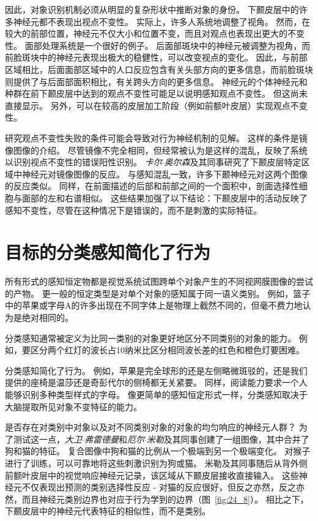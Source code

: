 因此，对象识别机制必须从明显的复杂形状中推断对象的身份。
下颞皮层中的许多神经元都不表现出视点不变性。
实际上，许多人系统地调整了视角。
然而，在较大的前部位置，神经元不仅大小和位置不变，而且对观点也表现出更大的不变性。
面部处理系统是一个很好的例子。
后面部斑块中的神经元被调整为视角，而前脸斑块中的神经元表现出极大的稳健性，可以改变视点的变化。
因此，与前部区域相比，后面面部区域中的人口反应包含有关头部方向的更多信息，而前脸斑块则提供了与后面部面积相比，有关跨头方向的更多信息。
神经元的个体神经元和种群在前下颞皮层中达到的观点不变性可能足以说明感知观点不变性。
但这尚未直接显示。
另外，可以在较高的皮层加工阶段（例如前额叶皮层）实现观点不变性。


研究观点不变性失败的条件可能会导致对行为神经机制的见解。
这样的条件是镜像图像的介绍。
尽管镜像不完全相同，但经常被认为是这样的混乱，反映了系统以识别视点不变性的错误阳性识别。
\textit{卡尔$\cdot$奥尔森}及其同事研究了下颞皮层特定区域中神经元对镜像图像的反应。
与感知混乱一致，许多下颞神经元对这两个图像的反应类似。
同样，在前面描述的后部和前部之间的一个面积中，剖面选择性细胞与面部的左和右谱相似。
这些结果加强了以下结论：下颞皮层中的活动反映了感知不变性，尽管在这种情况下是错误的，而不是刺激的实际特征。



\section{目标的分类感知简化了行为}

所有形式的感知恒定物都是视觉系统试图跨单个对象产生的不同视网膜图像的尝试的产物。
更一般的恒定类型是对单个对象的感知属于同一语义类别。
例如，篮子中的苹果或字母A的许多出现在不同字体上是物理上截然不同的，但毫不费力地认为是绝对相同的。


分类感知通常被定义为比同一类别的对象更好地区分不同类别的对象的能力。
例如，要区分两个红灯的波长占10纳米比区分相同波长差的红色和橙色灯要困难。


分类感知简化了行为。
例如，苹果是完全球形的还是左侧略微斑驳的，还是我们提供的座椅是温莎还是奇彭代尔的侧椅都无关紧要。
同样，阅读能力要求一个人能够识别多种类型样式的字母。
像更简单的感知恒定形式一样，分类感知取决于大脑提取所见对象不变特征的能力。


是否存在对类别中对象以及对不同类别对象的对象的均匀响应的神经元人群？
为了测试这一点，\textit{大卫$\cdot$弗雷德曼}和\textit{厄尔$\cdot$米勒}及其同事创建了一组图像，其中合并了狗和猫的特征。
复合图像中狗和猫的比例从一个极端到另一个极端变化。 
对猴子进行了训练，可以可靠地将这些刺激识别为狗或猫。
米勒及其同事随后从背外侧前额叶皮层中的视觉响应神经元记录，该区域从下颞皮层接收直接输入。
这些神经元不仅表现出预测的类别选择性反应 - 对猫的反应很好，但反之亦然，反之亦然，而且神经元类别边界也对应于行为学到的边界（图~\ref{fig:24_8}）。 
相比之下，下颞皮层中的神经元代表特征的相似性，而不是类别。


